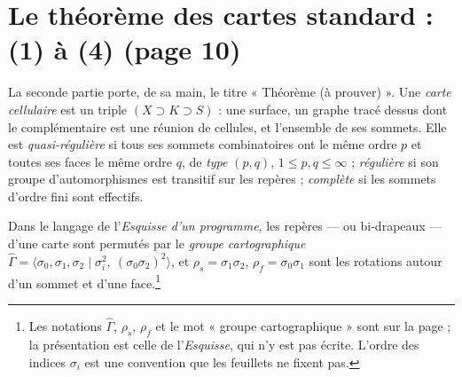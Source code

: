\documentclass[11pt,a4paper]{article}
\begin{document}
\section*{Le théorème des cartes standard : (1) à (4) (page 10)}

La seconde partie porte, de sa main, le titre « Théorème (à prouver) ». Une
\emph{carte cellulaire} est un triple $(X \supset K \supset S)$ : une surface,
un graphe tracé dessus dont le complémentaire est une réunion de cellules, et
l'ensemble de ses sommets. Elle est \emph{quasi-régulière} si tous ses sommets
combinatoires ont le même ordre $p$ et toutes ses faces le même ordre $q$, de
\emph{type} $(p, q)$, $1 \leq p, q \leq \infty$ ; \emph{régulière} si son groupe
d'automorphismes est transitif sur les repères ; \emph{complète} si les sommets
d'ordre fini sont effectifs.

Dans le langage de l'\emph{Esquisse d'un programme}, les repères --- ou
bi-drapeaux --- d'une carte sont permutés par le \emph{groupe cartographique}
$\widehat{\Gamma} = \langle \sigma_{0}, \sigma_{1}, \sigma_{2} \mid
\sigma_{i}^{2},\ (\sigma_{0}\sigma_{2})^{2} \rangle$, et
$\rho_{s} = \sigma_{1}\sigma_{2}$, $\rho_{f} = \sigma_{0}\sigma_{1}$ sont les
rotations autour d'un sommet et d'une face.\footnote{Les notations
$\widehat{\Gamma}$, $\rho_{s}$, $\rho_{f}$ et le mot « groupe cartographique »
sont sur la page ; la présentation est celle de l'\emph{Esquisse}, qui n'y est
pas écrite. L'ordre des indices $\sigma_{i}$ est une convention que les
feuillets ne fixent pas.}
\end{document}
